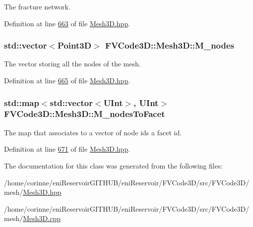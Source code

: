 The fracture network. 



Definition at line \hyperlink{Mesh3D_8hpp_source_l00663}{663} of file \hyperlink{Mesh3D_8hpp_source}{Mesh3\+D.\+hpp}.

\subsubsection[{\texorpdfstring{M\+\_\+nodes}{M_nodes}}]{\setlength{\rightskip}{0pt plus 5cm}std\+::vector$<${\bf Point3D}$>$ F\+V\+Code3\+D\+::\+Mesh3\+D\+::\+M\+\_\+nodes\hspace{0.3cm}{\ttfamily [protected]}}\hypertarget{classFVCode3D_1_1Mesh3D_a5464981fd097ce785675d91522884739}{}\label{classFVCode3D_1_1Mesh3D_a5464981fd097ce785675d91522884739}


The vector storing all the nodes of the mesh. 



Definition at line \hyperlink{Mesh3D_8hpp_source_l00665}{665} of file \hyperlink{Mesh3D_8hpp_source}{Mesh3\+D.\+hpp}.

\subsubsection[{\texorpdfstring{M\+\_\+nodes\+To\+Facet}{M_nodesToFacet}}]{\setlength{\rightskip}{0pt plus 5cm}std\+::map$<$std\+::vector$<${\bf U\+Int}$>$, {\bf U\+Int}$>$ F\+V\+Code3\+D\+::\+Mesh3\+D\+::\+M\+\_\+nodes\+To\+Facet\hspace{0.3cm}{\ttfamily [protected]}}\hypertarget{classFVCode3D_1_1Mesh3D_add5bb503fb6d9bf6ee0656f02e712b06}{}\label{classFVCode3D_1_1Mesh3D_add5bb503fb6d9bf6ee0656f02e712b06}


The map that associates to a vector of node ids a facet id. 



Definition at line \hyperlink{Mesh3D_8hpp_source_l00671}{671} of file \hyperlink{Mesh3D_8hpp_source}{Mesh3\+D.\+hpp}.



The documentation for this class was generated from the following files\+:\begin{DoxyCompactItemize}
\item 
/home/corinne/eni\+Reservoir\+G\+I\+T\+H\+U\+B/eni\+Reservoir/\+F\+V\+Code3\+D/src/\+F\+V\+Code3\+D/mesh/\hyperlink{Mesh3D_8hpp}{Mesh3\+D.\+hpp}\item 
/home/corinne/eni\+Reservoir\+G\+I\+T\+H\+U\+B/eni\+Reservoir/\+F\+V\+Code3\+D/src/\+F\+V\+Code3\+D/mesh/\hyperlink{Mesh3D_8cpp}{Mesh3\+D.\+cpp}\end{DoxyCompactItemize}
